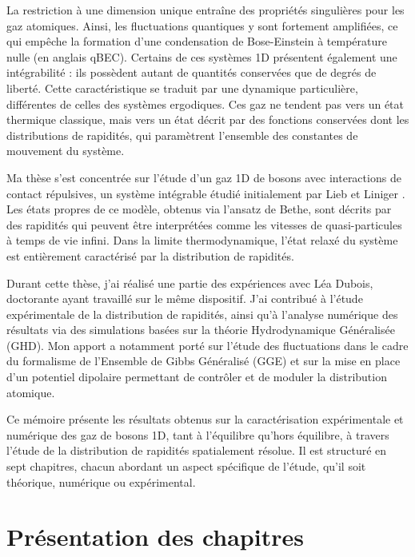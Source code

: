 \medskip

La restriction à une dimension unique entraîne des propriétés singulières pour les gaz atomiques. Ainsi, les fluctuations quantiques y sont fortement amplifiées, ce qui empêche la formation d’une condensation de Bose-Einstein à température nulle (en anglais \gls{qBEC}). Certains de ces systèmes 1D présentent également une intégrabilité : ils possèdent autant de quantités conservées que de degrés de liberté. Cette caractéristique se traduit par une dynamique particulière, différentes de celles des systèmes ergodiques. Ces gaz ne tendent pas vers un état thermique classique, mais vers un état décrit par des fonctions conservées dont les distributions de rapidités, qui paramètrent l’ensemble des constantes de mouvement du système.

\medskip

Ma thèse s’est concentrée sur l’étude d’un gaz 1D de bosons avec interactions de contact répulsives, un système intégrable étudié initialement par Lieb et Liniger \cite{LL_1963_1,LL_1963_2}. Les états propres de ce modèle, obtenus via l’ansatz de Bethe, sont décrits par des rapidités qui peuvent être interprétées comme les vitesses de quasi-particules à temps de vie infini. Dans la limite thermodynamique, l’état relaxé du système est entièrement caractérisé par la distribution de rapidités.  

\medskip

Durant cette thèse, j’ai réalisé une partie des expériences avec Léa Dubois, doctorante ayant travaillé sur le même dispositif. J’ai contribué à l’étude expérimentale de la distribution de rapidités, ainsi qu’à l’analyse numérique des résultats via des simulations basées sur la théorie Hydrodynamique Généralisée (\acrshort{GHD}). Mon apport a notamment porté sur l’étude des fluctuations dans le cadre du formalisme de l'Ensemble de Gibbs Généralisé (\acrshort{GGE}) et sur la mise en place d’un potentiel dipolaire permettant de contrôler et de moduler la distribution atomique.  

\medskip

Ce mémoire présente les résultats obtenus sur la caractérisation expérimentale et numérique des gaz de bosons 1D, tant à l’équilibre qu’hors équilibre, à travers l’étude de la distribution de rapidités spatialement résolue. Il est structuré en sept chapitres, chacun abordant un aspect spécifique de l’étude, qu’il soit théorique, numérique ou expérimental.



\section*{Présentation des chapitres}

